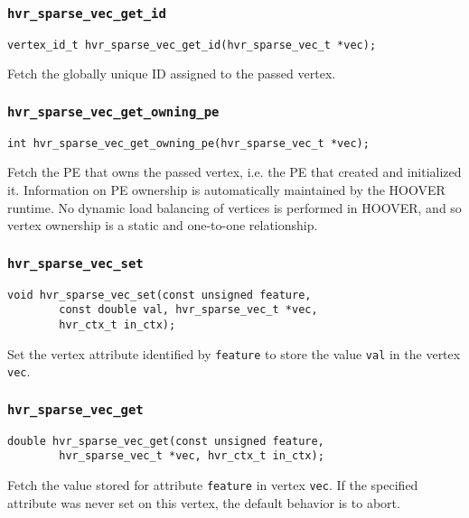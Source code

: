 \subsubsection{\texttt{hvr\_sparse\_vec\_get\_id}}

\begin{verbatim}
vertex_id_t hvr_sparse_vec_get_id(hvr_sparse_vec_t *vec);
\end{verbatim}

Fetch the globally unique ID assigned to the passed vertex.

\subsubsection{\texttt{hvr\_sparse\_vec\_get\_owning\_pe}}

\begin{verbatim}
int hvr_sparse_vec_get_owning_pe(hvr_sparse_vec_t *vec);
\end{verbatim}

Fetch the PE that owns the passed vertex, i.e. the PE that created and
initialized it. Information on PE ownership is automatically maintained by the
HOOVER runtime. No dynamic load balancing of vertices is performed in HOOVER,
and so vertex ownership is a static and one-to-one relationship.

\subsubsection{\texttt{hvr\_sparse\_vec\_set}}

\begin{verbatim}
void hvr_sparse_vec_set(const unsigned feature,
        const double val, hvr_sparse_vec_t *vec,
        hvr_ctx_t in_ctx);
\end{verbatim}

Set the vertex attribute identified by \texttt{feature} to store the value
\texttt{val} in the vertex \texttt{vec}.

\subsubsection{\texttt{hvr\_sparse\_vec\_get}}

\begin{verbatim}
double hvr_sparse_vec_get(const unsigned feature,
        hvr_sparse_vec_t *vec, hvr_ctx_t in_ctx);
\end{verbatim}

Fetch the value stored for attribute \texttt{feature} in vertex \texttt{vec}. If
the specified attribute was never set on this vertex, the default behavior is to
abort.

